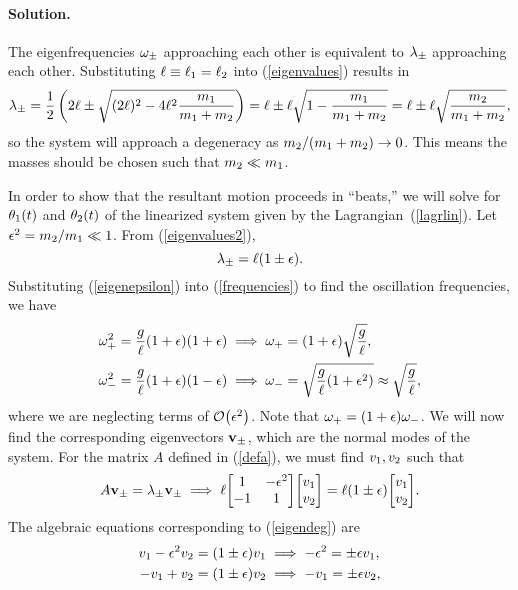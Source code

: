 \documentclass[11pt]{article}
\newcommand{\refeq}[1]{(\ref{#1})}
\newenvironment{solution}
{
    \paragraph{Solution.}
    \ignorespaces
}
{
    \bigskip
}
\begin{document}
\begin{solution}
	The eigenfrequencies $\omega_\pm$ approaching each other is equivalent to $\lambda_\pm$ approaching each other.  Substituting $\ell \equiv \ell_1 = \ell_2$ into \refeq{eigenvalues} results in
	\begin{equation} \label{eigenvalues2}
		\lambda_\pm = \frac{1}{2} \left( 2 \ell \pm \sqrt{(2 \ell)^2 - 4 \ell^2 \frac{m_1}{m_1 + m_2}} \right) = \ell \pm \ell \sqrt{1 - \frac{m_1}{m_1 + m_2}} = \ell \pm \ell \sqrt{\frac{m_2}{m_1 + m_2}},
	\end{equation}
	so the system will approach a degeneracy as $m_2 / (m_1 + m_2) \to 0$.  This means the masses should be chosen such that $m_2 \ll m_1$.

	In order to show that the resultant motion proceeds in ``beats,'' we will solve for $\theta_1(t)$ and $\theta_2(t)$ of the linearized system given by the Lagrangian~\refeq{lagrlin}.  Let $\epsilon^2 = m_2 / m_1 \ll 1$.  From \refeq{eigenvalues2},
	\begin{equation} \label{eigenepsilon}
		\lambda_\pm = \ell (1 \pm \epsilon).
	\end{equation}
	Substituting \refeq{eigenepsilon} into \refeq{frequencies} to find the oscillation frequencies, we have
	\begin{align}
		\omega_+^2 = \frac{g}{\ell} (1 + \epsilon) (1 + \epsilon) &\implies \omega_+ = (1 + \epsilon) \sqrt{\frac{g}{\ell}}, \\
		\omega_-^2 = \frac{g}{\ell} (1 + \epsilon) (1 - \epsilon) &\implies \omega_- = \sqrt{\frac{g}{\ell} (1 + \epsilon^2)} \approx \sqrt{\frac{g}{\ell}},
	\end{align}
	where we are neglecting terms of $\order{\epsilon^2}$.  Note that $\omega_+ = (1 + \epsilon) \omega_-$.  We will now find the corresponding eigenvectors $\mathbf{v}_\pm$, which are the normal modes of the system.  For the matrix $A$ defined in \refeq{defa}, we must find $v_1, v_2$ such that
	\begin{equation} \label{eigendeg}
		A \vvpm = \lmpm \vvpm \implies \ell \mqty[ 1 & -\epsilon^2 \\ -1 & 1 ] \mqty[ \vq \\ \vw ] = \ell (1 \pm \epsilon) \mqty[ \vq \\ \vw ].
	\end{equation}
	The algebraic equations corresponding to \refeq{eigendeg} are
	\begin{align}
		\vq - \epsilon^2 \vw = (1 \pm \epsilon) \vq &\implies -\epsilon^2 = \pm \epsilon \vq, \\
		-\vq + \vw = (1 \pm \epsilon) \vw &\implies -\vq = \pm \epsilon \vw,

\end{align}
\end{solution}
\end{document}
